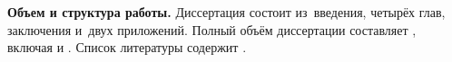 \newcommand{\actuality}{}
\newcommand{\progress}{}
\newcommand{\aim}{{\textbf\aimTXT}}
\newcommand{\tasks}{\textbf{\tasksTXT} }
\newcommand{\novelty}{\textbf{\noveltyTXT}}
\newcommand{\influence}{\textbf{\influenceTXT}}
\newcommand{\methods}{\textbf{\methodsTXT}}
\newcommand{\defpositions}{\textbf{\defpositionsTXT}}
\newcommand{\reliability}{\textbf{\reliabilityTXT}}
\newcommand{\probation}{\textbf{\probationTXT}}
\newcommand{\contribution}{\textbf{\contributionTXT}}
\newcommand{\publications}{\textbf{\publicationsTXT}}
\newcommand{\workrequirements}{\textbf{\workrequirementsTXT}}



\textbf{Объем и структура работы.} Диссертация состоит из~введения, четырёх глав, заключения и~двух приложений.
%
Полный объём диссертации составляет
, включая
 и
.   Список литературы содержит  
.
